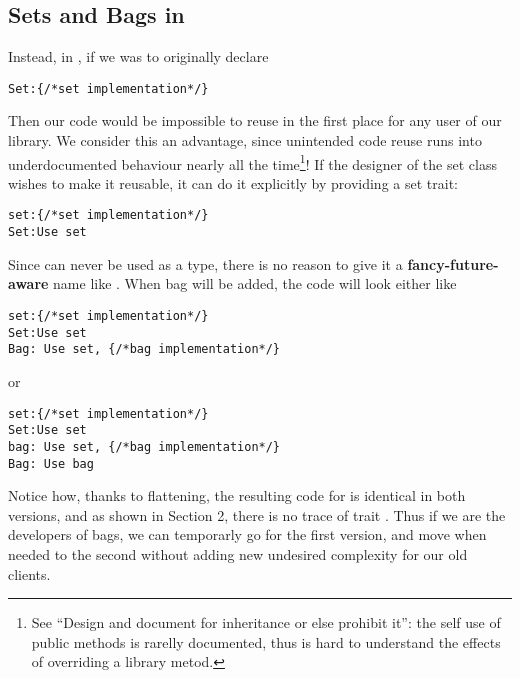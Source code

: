 \subsection{Sets and Bags in \name}
Instead, in \name, if we was to originally declare
\saveSpace\begin{lstlisting}
Set:{/*set implementation*/} 
\end{lstlisting}\saveSpace
Then our code would be impossible to reuse in the first place for any user of our library.
We consider this an advantage, since unintended code reuse runs into underdocumented behaviour nearly all the time\footnote{See
``Design and document for inheritance or else prohibit
it''\cite{Bloch08}: the
self use of public methods is rarelly documented, thus is hard to understand the effects of overriding a library metod.
}!
If the designer of the set class wishes to make it reusable, it can do it explicitly by providing a set trait:
\saveSpace\begin{lstlisting}
set:{/*set implementation*/} 
Set:Use set
\end{lstlisting}\saveSpace
Since \Q@set@ can never be used as a type, there is no reason to give it a {\bf fancy-future-aware} name like
\Q@AbstractSetOrBag@.
When bag will be added, the code will look either like
\saveSpace\begin{lstlisting}
set:{/*set implementation*/} 
Set:Use set
Bag: Use set, {/*bag implementation*/}
\end{lstlisting}\saveSpace\saveSpace
or 
\saveSpace\saveSpace\begin{lstlisting}
set:{/*set implementation*/} 
Set:Use set
bag: Use set, {/*bag implementation*/}
Bag: Use bag
\end{lstlisting}\saveSpace
Notice how, thanks to flattening, the resulting code for \Q@Bag@ is identical in both versions, 
and as shown in Section 2, there is no trace of trait \Q@bag@. Thus if we are the developers of bags, we can temporarly go for the first version, and move when needed to the second without adding new undesired complexity for our old clients. 



